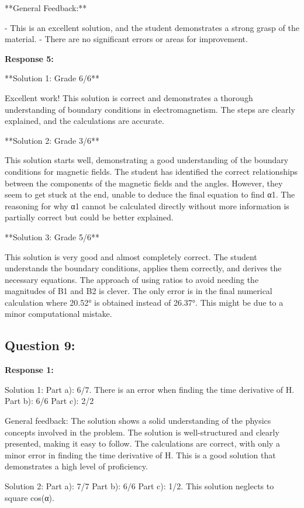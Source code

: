 \documentclass[a4paper,11pt]{article}
\begin{document}
**General Feedback:**

- This is an excellent solution, and the student demonstrates a strong grasp of the material.
- There are no significant errors or areas for improvement.

\bigskip    
\textbf{Response 5:}

**Solution 1: Grade 6/6**

Excellent work! This solution is correct and demonstrates a thorough understanding of boundary conditions in electromagnetism. The steps are clearly explained, and the calculations are accurate. 

**Solution 2: Grade 3/6**

This solution starts well, demonstrating a good understanding of the boundary conditions for magnetic fields. The student has identified the correct relationships between the components of the magnetic fields and the angles. However, they seem to get stuck at the end, unable to deduce the final equation to find α1. The reasoning for why α1 cannot be calculated directly without more information is partially correct but could be better explained.

**Solution 3: Grade 5/6**

This solution is very good and almost completely correct. The student understands the boundary conditions, applies them correctly, and derives the necessary equations. The approach of using ratios to avoid needing the magnitudes of B1 and B2 is clever. The only error is in the final numerical calculation where 20.52° is obtained instead of 26.37°. This might be due to a minor computational mistake.

\subsection*{Question 9:}

\textbf{Response 1:}

Solution 1:
Part a): 6/7. There is an error when finding the time derivative of H.
Part b): 6/6
Part c): 2/2

General feedback: The solution shows a solid understanding of the physics concepts involved in the problem. The solution is well-structured and clearly presented, making it easy to follow. The calculations are correct, with only a minor error in finding the time derivative of H. This is a good solution that demonstrates a high level of proficiency.

Solution 2:
Part a): 7/7
Part b): 6/6
Part c): 1/2. This solution neglects to square cos(α).
\end{document}

